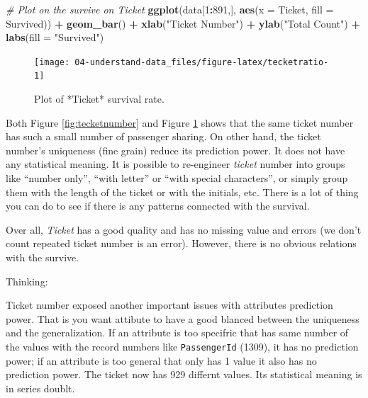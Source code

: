 \documentclass[
]{book}
\newenvironment{Shaded}{\begin{snugshade}}{\end{snugshade}}
\newcommand{\CommentTok}[1]{\textcolor[rgb]{0.56,0.35,0.01}{\textit{#1}}}
\newcommand{\DataTypeTok}[1]{\textcolor[rgb]{0.13,0.29,0.53}{#1}}
\newcommand{\DecValTok}[1]{\textcolor[rgb]{0.00,0.00,0.81}{#1}}
\newcommand{\KeywordTok}[1]{\textcolor[rgb]{0.13,0.29,0.53}{\textbf{#1}}}
\newcommand{\NormalTok}[1]{#1}
\newcommand{\OperatorTok}[1]{\textcolor[rgb]{0.81,0.36,0.00}{\textbf{#1}}}
\newcommand{\StringTok}[1]{\textcolor[rgb]{0.31,0.60,0.02}{#1}}
\begin{document}
\begin{Shaded}
\begin{Highlighting}[]
\CommentTok{# Plot on the survive on Ticket}
\KeywordTok{ggplot}\NormalTok{(data[}\DecValTok{1}\OperatorTok{:}\DecValTok{891}\NormalTok{,], }\KeywordTok{aes}\NormalTok{(}\DataTypeTok{x =}\NormalTok{ Ticket, }\DataTypeTok{fill =}\NormalTok{ Survived)) }\OperatorTok{+}
\StringTok{  }\KeywordTok{geom_bar}\NormalTok{() }\OperatorTok{+}
\StringTok{  }\KeywordTok{xlab}\NormalTok{(}\StringTok{"Ticket Number"}\NormalTok{) }\OperatorTok{+}
\StringTok{  }\KeywordTok{ylab}\NormalTok{(}\StringTok{"Total Count"}\NormalTok{)  }\OperatorTok{+}
\StringTok{  }\KeywordTok{labs}\NormalTok{(}\DataTypeTok{fill =} \StringTok{"Survived"}\NormalTok{)}
\end{Highlighting}
\end{Shaded}

\begin{figure}

{\centering \texttt{[image: 04-understand-data\_files/figure-latex/tecketratio-1]} 

}

\caption{Plot of *Ticket* survival rate.}\label{fig:tecketratio}
\end{figure}

Both Figure \ref{fig:tecketnumber} and Figure \ref{fig:tecketratio} shows that the same ticket number has such a small number of passenger sharing. On other hand, the ticket number's uniqueness (fine grain) reduce its prediction power. It does not have any statistical meaning. It is possible to re-engineer \emph{ticket} number into groups like ``number only'', ``with letter'' or ``with special characters'', or simply group them with the length of the ticket or with the initials, etc. There is a lot of thing you can do to see if there is any patterns connected with the survival.

Over all, \emph{Ticket} has a good quality and has no missing value and errors (we don't count repeated ticket number is an error). However, there is no obvious relations with the survive.

\begin{rmdthinking}
Thinking:

Ticket number exposed another important issues with attributes prediction power. That is you want attibute to have a good blanced between the uniqueness and the generalization. If an attribute is too specifric that has same number of the values with the record numbers like \texttt{PassengerId} (1309), it has no prediction power; if an attribute is too general that only has 1 value it also has no prediction power. The ticket now has 929 differnt values. Its statistical meaning is in series doublt.\\
\end{rmdthinking}
\end{document}
